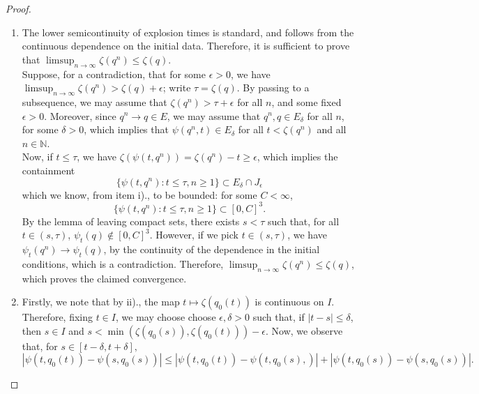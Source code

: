\documentclass[11pt, notitlepage]{article}
\newcommand{\abs}[1]{\left\lvert{#1}\right\rvert}
\begin{document}
\begin{proof}
\begin{enumerate}[label=\roman{*}).]
    \item The lower semicontinuity of explosion times is standard, and follows from the continuous dependence on the initial data. Therefore, it is sufficient to prove that $\limsup_{n\rightarrow \infty} \zeta(q^n)\le \zeta(q).$  \medskip \\ Suppose, for a contradiction, that for some $\epsilon>0$, we have $\limsup_{n\rightarrow \infty} \zeta(q^n)>\zeta(q)+\epsilon$; write $\tau=\zeta(q)$. By passing to a subsequence, we may assume that $\zeta(q^n)>\tau+\epsilon$ for all $n$, and some fixed $\epsilon>0$. Moreover, since $q^n\rightarrow q \in E$, we may assume that $q^n, q \in E_\delta$ for all $n$, for some $\delta>0$, which implies that $\psi(q^n,t)\in E_\delta$ for all $t<\zeta(q^n)$ and all $n\in \mathbb{N}$.\medskip\\  Now, if $t\le \tau$, we have $\zeta(\psi(t,q^n))=\zeta(q^n)-t \ge \epsilon$, which implies the containment \begin{equation} \{\psi(t,q^n): t\le \tau, n\ge 1\} \subset E_\delta\cap J_\epsilon \end{equation} which we know, from item i)., to be bounded: for some $C<\infty$, \begin{equation}
        \{\psi(t,q^n): t\le \tau, n\ge 1\} \subset [0,C]^3.
    \end{equation} By the lemma of leaving compact sets, there exists $s<\tau$ such that, for all $t\in (s,\tau)$, $\psi_t(q)\not \in [0,C]^3.$ However, if we pick $t\in (s,\tau)$, we have $\psi_t(q^n) \rightarrow \psi_t(q)$, by the continuity of the dependence in the initial conditions, which is a contradiction. Therefore, $\limsup_{n\rightarrow \infty} \zeta(q^n)\le \zeta(q)$, which proves the claimed convergence.      
    \item  Firstly, we note that by ii)., the map $t\mapsto \zeta(q_0(t))$ is continuous on $I$. Therefore, fixing $t\in I$, we may choose choose  $\epsilon, \delta > 0$ such that, if $\abs{t-s} \le \delta$, then $s\in I$ and $s < \min \left(\zeta\left(q_0(s)\right), \zeta\left(q_0(t)\right)\right)-\epsilon$. Now, we observe that, for $s\in [t-\delta, t+\delta],$\begin{equation}
    |\psi(t,q_0(t))-\psi(s,q_0(s))|\le|\psi(t,q_0(t))-\psi(t,q_0(s), )|+|\psi(t,q_0(s))-\psi(s,q_0(s))|.

\end{equation}
\end{enumerate}
\end{proof}
\end{document}
